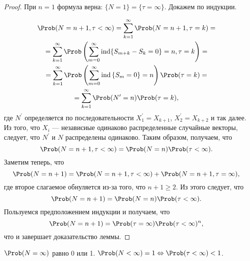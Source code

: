 \begin{proof}
  При $n = 1$ формула верна: $\lbrace N = 1 \rbrace = \lbrace \tau = \infty \rbrace$. Докажем по индукции.

  \begin{multline*}
    \Prob(N = n+1, \tau < \infty) = \sum_{k=1}^{\infty} \Prob(N = n+1, \tau = k) =\\
    = \sum_{k=1}^{\infty} \Prob\left( \sum_{m=0}^{\infty} \ind \lbrace S_{m+k} - S_{k} = 0 \rbrace = n, \tau = k\right) =\\
    = \sum_{k=1}^{\infty} \Prob\left( \sum_{m=0}^{\infty} \ind \left\lbrace S_{m} = 0 \right\rbrace = n\right)\Prob(\tau = k) =\\
    = \sum_{k=1}^{\infty} \Prob(N^{\prime} = n)\Prob(\tau = k),
  \end{multline*}
  где $N^{\prime}$ определяется по последовательности $X_{1}^{\prime} = X_{k+1}$, $X_{2}^{\prime} = X_{k+2}$ и так далее. Из того, что $X_{i}$ --- независиые одинаково распределенные случайные векторы, следует, что $N^{\prime}$ и $N$ распределены одинаково. Таким образом, получаем, что
  \begin{equation*}
    \Prob(N = n+1, \tau < \infty) = \Prob(N = n)\Prob(\tau < \infty).
  \end{equation*}
  Заметим теперь, что
  \begin{equation*}
    \Prob(N = n+1) = \Prob(N = n+1, \tau < \infty) + \Prob(N = n+1, \tau = \infty),
  \end{equation*}
  где второе слагаемое обнуляется из-за того, что $n+1 \geqslant 2$. Из этого следует, что
  \begin{equation*}
    \Prob(N = n+1) = \Prob(N = n)\Prob(\tau < \infty).
  \end{equation*}
  Пользуемся предположением индукции и получаем, что
  \begin{equation*}
    \Prob(N = n+1) = \Prob(\tau = \infty)\Prob(\tau < \infty)^{n},
  \end{equation*}
  что и завершает доказательство леммы.
\end{proof}

\begin{cor}
  $\Prob(N = \infty)$ равно 0 или 1. $\Prob(N < \infty) = 1 \Leftrightarrow \Prob(\tau < \infty) < 1$.
\end{cor}

